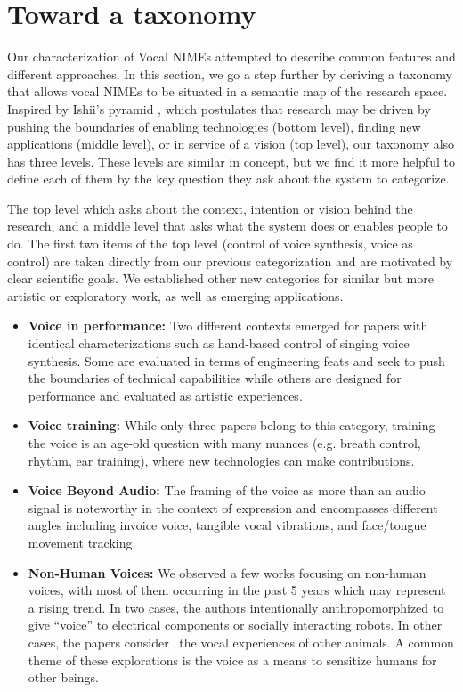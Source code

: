 \documentclass[sigconf]{nimeart}
\begin{document}
\section{\texorpdfstring{\textbf{Toward a taxonomy}}{Toward a taxonomy}}\label{toward-a-taxonomy}

Our characterization of Vocal NIMEs attempted to describe common features and different approaches. In this section, we go a step further by deriving a taxonomy that allows vocal NIMEs to be situated in a semantic map of the research space. Inspired by Ishii's pyramid \cite{c62}, which postulates that research may be driven by pushing the boundaries of enabling technologies (bottom level), finding new applications (middle level), or in service of a vision (top level), our taxonomy also has three levels. These levels are similar in concept, but we find it more helpful to define each of them by the key question they ask about the system to categorize.~

The top level which asks about the context, intention or vision behind the research, and a middle level that asks what the system does or enables people to do. The first two items of the top level (control of voice synthesis, voice as control) are taken directly from our previous categorization and are motivated by clear scientific goals. We established other new categories for similar but more artistic or exploratory work, as well as emerging applications.

\begin{itemize}
\item
  \textbf{Voice in performance:} Two different contexts emerged for papers with identical characterizations such as hand-based control of singing voice synthesis. Some are evaluated in terms of engineering feats and seek to push the boundaries of technical capabilities while others are designed for performance and evaluated as artistic experiences.~
\item
  \textbf{Voice training:} While only three papers belong to this category, training the voice is an age-old question with many nuances (e.g. breath control, rhythm, ear training), where new technologies can make contributions.
\item
  \textbf{Voice Beyond Audio:} The framing of the voice as more than an audio signal is noteworthy in the context of expression and encompasses different angles including invoice voice, tangible vocal vibrations, and face/tongue movement tracking.~
\item
  \textbf{Non-Human Voices:} We \textbf{} observed a few works focusing on non-human voices, with most of them occurring in the past 5 years which may represent a rising trend. In two cases, the authors intentionally anthropomorphized to give ``voice'' to electrical components or socially interacting robots. In other cases, the papers consider~ the vocal experiences of other animals. A common theme of these explorations is the voice as a means to sensitize humans for other beings.
\end{itemize}
\end{document}
